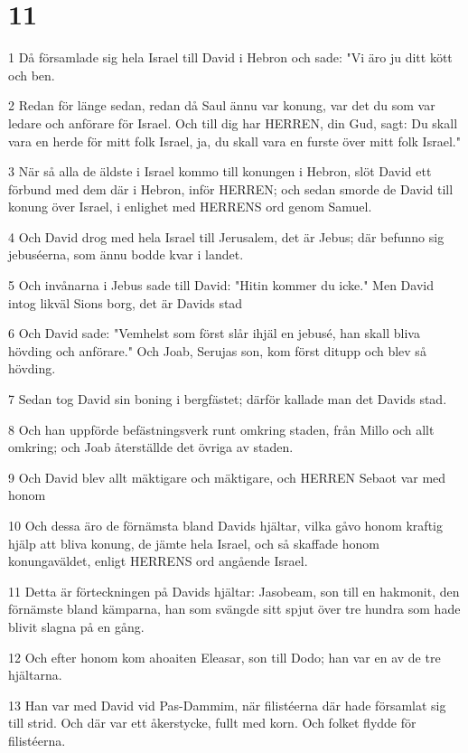 \chapter{11}

\par 1 Då församlade sig hela Israel till David i Hebron och sade: "Vi äro ju ditt kött och ben.
\par 2 Redan för länge sedan, redan då Saul ännu var konung, var det du som var ledare och anförare för Israel. Och till dig har HERREN, din Gud, sagt: Du skall vara en herde för mitt folk Israel, ja, du skall vara en furste över mitt folk Israel."
\par 3 När så alla de äldste i Israel kommo till konungen i Hebron, slöt David ett förbund med dem där i Hebron, inför HERREN; och sedan smorde de David till konung över Israel, i enlighet med HERRENS ord genom Samuel.
\par 4 Och David drog med hela Israel till Jerusalem, det är Jebus; där befunno sig jebuséerna, som ännu bodde kvar i landet.
\par 5 Och invånarna i Jebus sade till David: "Hitin kommer du icke." Men David intog likväl Sions borg, det är Davids stad
\par 6 Och David sade: "Vemhelst som först slår ihjäl en jebusé, han skall bliva hövding och anförare." Och Joab, Serujas son, kom först ditupp och blev så hövding.
\par 7 Sedan tog David sin boning i bergfästet; därför kallade man det Davids stad.
\par 8 Och han uppförde befästningsverk runt omkring staden, från Millo och allt omkring; och Joab återställde det övriga av staden.
\par 9 Och David blev allt mäktigare och mäktigare, och HERREN Sebaot var med honom
\par 10 Och dessa äro de förnämsta bland Davids hjältar, vilka gåvo honom kraftig hjälp att bliva konung, de jämte hela Israel, och så skaffade honom konungaväldet, enligt HERRENS ord angående Israel.
\par 11 Detta är förteckningen på Davids hjältar: Jasobeam, son till en hakmonit, den förnämste bland kämparna, han som svängde sitt spjut över tre hundra som hade blivit slagna på en gång.
\par 12 Och efter honom kom ahoaiten Eleasar, son till Dodo; han var en av de tre hjältarna.
\par 13 Han var med David vid Pas-Dammim, när filistéerna där hade församlat sig till strid. Och där var ett åkerstycke, fullt med korn. Och folket flydde för filistéerna.
